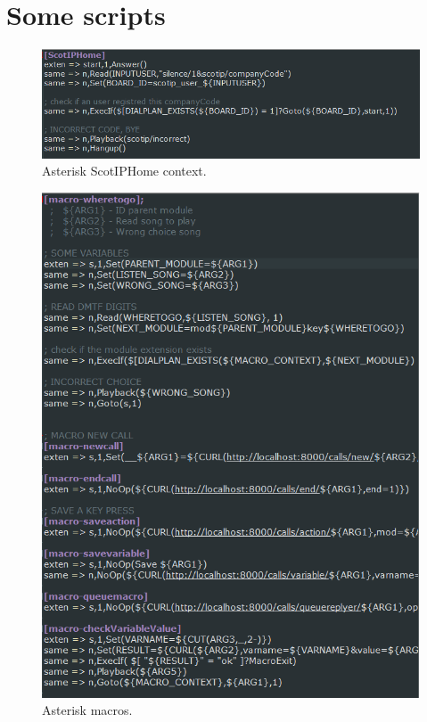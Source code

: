 \section{Some scripts}

\begin{figure}[!ht]
  \caption{Asterisk ScotIPHome context.}
  \centering
    \includegraphics[width=1\textwidth]{img/ScotIPHome.png}
\end{figure}


\begin{figure}[!ht]
  \caption{Asterisk macros.}
  \centering
    \includegraphics[width=1\textwidth]{img/asteriskMacros.png}
\end{figure}

